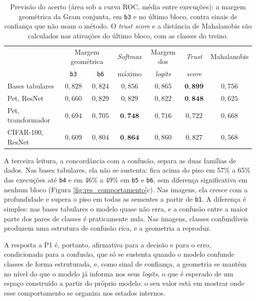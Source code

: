 \begin{table}[pos=htbp]
\centering
\caption{Previsão do acerto (área sob a curva ROC, média entre execuções): a margem geométrica da Gram conjunta, em \texttt{b3} e no último bloco, contra sinais de confiança que não usam o método. O \textit{trust score} e a distância de Mahalanobis são calculados nas ativações do último bloco, com as classes do treino.}
\label{tab:res_confianca}
\footnotesize
\setlength{\tabcolsep}{4pt}
\begin{tabular}{l c c c c c c}
\hline
 & \multicolumn{2}{c}{Margem geométrica} & \textit{Softmax} & Margem dos & \textit{Trust} & Mahalanobis \\
 & \texttt{b3} & \texttt{b6} & máximo & \textit{logits} & \textit{score} & \\
\hline
Bases tabulares & $0{,}828$ & $0{,}824$ & $0{,}856$ & $0{,}865$ & $\mathbf{0{,}899}$ & $0{,}756$ \\
Pet, ResNet & $0{,}660$ & $0{,}829$ & $0{,}829$ & $0{,}822$ & $\mathbf{0{,}848}$ & $0{,}625$ \\
Pet, transformador & $0{,}694$ & $0{,}705$ & $\mathbf{0{,}748}$ & $0{,}716$ & $0{,}722$ & $0{,}668$ \\
CIFAR-100, ResNet & $0{,}609$ & $0{,}804$ & $\mathbf{0{,}864}$ & $0{,}860$ & $0{,}827$ & $0{,}568$ \\
\hline
\end{tabular}
\end{table}

A terceira leitura, a concordância com a confusão, separa as duas famílias de dados. Nas bases tabulares, ela não se sustenta: fica acima do piso em 57\% a 65\% das execuções até \texttt{b4} e em 46\% a 49\% em \texttt{b5} e \texttt{b6}, sem diferença significativa em nenhum bloco (Figura \ref{fig:res_comportamento}c). Nas imagens, ela cresce com a profundidade e supera o piso em todas as sementes a partir de \texttt{b1}. A diferença é simples: nas bases tabulares o modelo quase não erra, e a confusão entre a maior parte dos pares de classes é praticamente nula. Nas imagens, classes confundíveis produzem uma estrutura de confusão rica, e a geometria a reproduz.

A resposta a P1 é, portanto, afirmativa para a decisão e para o erro, condicionada para a confusão, que só se sustenta quando o modelo confunde classes de forma estruturada, e, como sinal de confiança, a geometria se mantém no nível do que o modelo já informa nos seus \textit{logits}, o que é esperado de um espaço construído a partir do próprio modelo: o seu valor está em mostrar onde esse comportamento se organiza nos estados internos.

